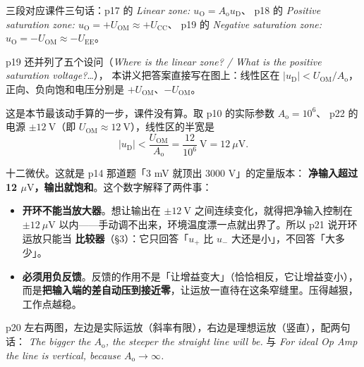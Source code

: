 \documentclass[11pt]{ctexart}
\begin{document}
三段对应课件三句话：p17 的 \textit{Linear zone: $u_{\mathrm{O}}=A_{\mathrm{o}}u_{\mathrm{D}}$}、
p18 的 \textit{Positive saturation zone: $u_{\mathrm{O}}=+U_{\mathrm{OM}}\approx+U_{\mathrm{CC}}$}、
p19 的 \textit{Negative saturation zone: $u_{\mathrm{O}}=-U_{\mathrm{OM}}\approx-U_{\mathrm{EE}}$}。

p19 还并列了五个设问（\textit{Where is the linear zone? / What is the positive saturation voltage?}…），
本讲义把答案直接写在图上：线性区在 $\left|u_{\mathrm{D}}\right|<U_{\mathrm{OM}}/A_{\mathrm{o}}$，
正向、负向饱和电压分别是 $+U_{\mathrm{OM}}$、$-U_{\mathrm{OM}}$。


这是本节最该动手算的一步，课件没有算。取 p10 的实际参数 $A_{\mathrm{o}}=10^{6}$、
p22 的电源 $\pm12\ \mathrm{V}$（即 $U_{\mathrm{OM}}\approx12\ \mathrm{V}$），线性区的半宽是
\[
\left|u_{\mathrm{D}}\right|<\frac{U_{\mathrm{OM}}}{A_{\mathrm{o}}}
=\frac{12}{10^{6}}\ \mathrm{V}=12\ \mu\mathrm{V}.
\]

十二微伏。这就是 p14 那道题「3 mV 就顶出 3000 V」的定量版本：
\textbf{净输入超过 12 $\mu\mathrm{V}$，输出就饱和}。这个数字解释了两件事：

\begin{itemize}
\item \textbf{开环不能当放大器}。想让输出在 $\pm12\ \mathrm{V}$ 之间连续变化，就得把净输入控制在
$\pm12\ \mu\mathrm{V}$ 以内——手动调不出来，环境温度漂一点就出界了。所以 p21 说开环运放只能当
\textbf{比较器}（§3）：它只回答「$u_+$ 比 $u_-$ 大还是小」，不回答「大多少」。
\item \textbf{必须用负反馈}。反馈的作用不是「让增益变大」（恰恰相反，它让增益变小），
而是\textbf{把输入端的差自动压到接近零}，让运放一直待在这条窄缝里。压得越狠，工作点越稳。
\end{itemize}



p20 左右两图，左边是实际运放（斜率有限），右边是理想运放（竖直），配两句话：
\textit{The bigger the $A_{\mathrm{o}}$, the steeper the straight line will be.}
与 \textit{For ideal Op Amp the line is vertical, because $A_{\mathrm{o}}\to\infty$.}
\end{document}
